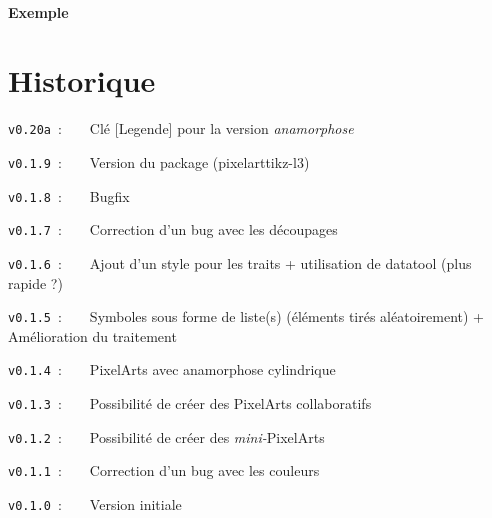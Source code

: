 \documentclass{article}
\begin{document}
\subsection{Exemple}

\begin{PresentationCode}{}


\end{PresentationCode}

\pagebreak

\part{Historique}

\verb|v0.20a|~:~~~~Clé \textsf{[Legende]} pour la version \textit{anamorphose}

\verb|v0.1.9|~:~~~~Version  du package (\textsf{pixelarttikz-l3})

\verb|v0.1.8|~:~~~~Bugfix

\verb|v0.1.7|~:~~~~Correction d'un bug avec les découpages

\verb|v0.1.6|~:~~~~Ajout d'un style pour les traits + utilisation de \textsf{datatool} (plus rapide ?)

\verb|v0.1.5|~:~~~~Symboles sous forme de liste(s) (éléments tirés aléatoirement) + Amélioration du traitement

\verb|v0.1.4|~:~~~~PixelArts avec anamorphose cylindrique

\verb|v0.1.3|~:~~~~Possibilité de créer des PixelArts collaboratifs

\verb|v0.1.2|~:~~~~Possibilité de créer des \textit{mini-}PixelArts

\verb|v0.1.1|~:~~~~Correction d'un bug avec les couleurs

\verb|v0.1.0|~:~~~~Version initiale
\end{document}
